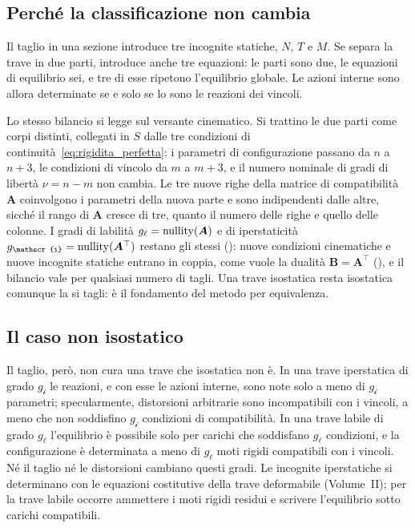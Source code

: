 \subsection{Perché la classificazione non cambia}
\label{sec:perche_invarianza}

Il taglio in una sezione introduce tre incognite
statiche, $N$, $T$ e $M$. Se separa la trave in due
parti, introduce anche tre equazioni: le parti sono due,
le equazioni di equilibrio sei, e tre di esse ripetono
l'equilibrio globale. Le azioni interne sono allora
determinate se e solo se lo sono le reazioni dei vincoli.

Lo stesso bilancio si legge sul versante cinematico. Si
trattino le due parti come corpi distinti, collegati in
$S$ dalle tre condizioni di
continuità~\eqref{eq:rigidita_perfetta}: i parametri di
configurazione passano da $n$ a $n + 3$, le condizioni di
vincolo da $m$ a $m + 3$, e il numero nominale di gradi
di libertà $\nu = n - m$ non cambia. Le tre nuove righe
della matrice di compatibilità $\bm{A}$ coinvolgono i
parametri della nuova parte e sono indipendenti dalle
altre, sicché il rango di $\bm{A}$ cresce di tre, quanto
il numero delle righe e quello delle colonne. I gradi di
labilità $g_\ell = \operatorname{nullity}(\bm{A})$ e di iperstaticità
$g_{\mathscr{i}} = \nl(\bm{A}^{\top})$ restano gli
stessi (): nuove
condizioni cinematiche e nuove incognite statiche
entrano in coppia, come vuole la dualità
$\bm{B} = \bm{A}^{\top}$ (), e il
bilancio vale per qualsiasi numero di tagli. Una trave
isostatica resta isostatica comunque la si tagli: è il
fondamento del metodo per equivalenza.

\subsection{Il caso non isostatico}
\label{sec:taglio_iperstatica}

Il taglio, però, non cura una trave che isostatica non
è. In una trave iperstatica di grado $g_{\mathscr{i}}$
le reazioni, e con esse le azioni interne, sono note solo
a meno di $g_{\mathscr{i}}$ parametri; specularmente,
distorsioni arbitrarie sono incompatibili con i vincoli,
a meno che non soddisfino $g_{\mathscr{i}}$ condizioni di
compatibilità. In una trave labile di grado $g_\ell$
l'equilibrio è possibile solo per carichi che soddisfano
$g_\ell$ condizioni, e la configurazione è determinata
a meno di $g_\ell$ moti rigidi compatibili con i vincoli.
Né il taglio né le distorsioni cambiano questi gradi.
Le incognite iperstatiche si determinano con le equazioni
costitutive della trave deformabile (Volume~II); per la
trave labile occorre ammettere i moti rigidi residui e
scrivere l'equilibrio sotto carichi compatibili.

